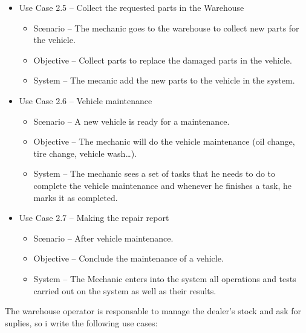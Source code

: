 \begin{itemize}
\begin{itemize}
    \end{itemize}
  \item Use Case 2.5 – Collect the requested parts in the Warehouse
  \begin{itemize}
    \item Scenario – The mechanic goes to the warehouse to collect new parts for the vehicle.
    \item Objective – Collect parts to replace the damaged parts in the vehicle.
    \item System – The mecanic add the new parts to the vehicle in the system.
  \end{itemize}
\item Use Case 2.6 – Vehicle maintenance
\begin{itemize}
  \item Scenario – A new vehicle is ready for a maintenance.
  \item Objective – The mechanic will do the vehicle maintenance (oil change, tire change, vehicle wash…).
  \item System – The mechanic sees a set of tasks that he needs to do to complete the vehicle maintenance and whenever he finishes a task, he marks it as completed.
\end{itemize}
\item Use Case 2.7 – Making the repair report
\begin{itemize}
  \item Scenario – After vehicle maintenance.
  \item Objective – Conclude the maintenance of a vehicle.
  \item System – The Mechanic enters into the system all operations and tests carried out on the system as well as their results.
\end{itemize}
\end{itemize}
\hfill \break

The warehouse operator is responsable to manage the dealer's stock and ask for suplies, so i write the following use cases:

